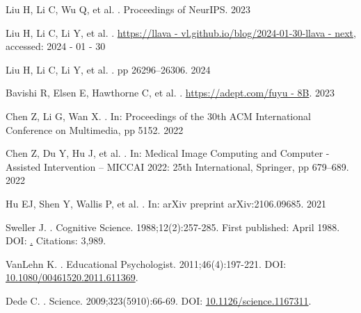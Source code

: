 \documentclass[10pt,letterpaper]{article}
\begin{document}
\begin{thebibliography}{10}
Liu H, Li C, Wu Q, et al.
.
\newblock Proceedings of NeurIPS. 2023

Liu H, Li C, Li Y, et al.
.
\newblock \url{https://llava - vl.github.io/blog/2024-01-30-llava - next}, accessed: 2024 - 01 - 30

Liu H, Li C, Li Y, et al.
.
\newblock pp 26296--26306. 2024

Bavishi R, Elsen E, Hawthorne C, et al.
.
\newblock \url{https://adept.com/fuyu - 8B}. 2023

Chen Z, Li G, Wan X.
.
\newblock In: Proceedings of the 30th ACM International Conference on Multimedia, pp 5152. 2022

Chen Z, Du Y, Hu J, et al.
.
\newblock In: Medical Image Computing and Computer - Assisted Intervention -- MICCAI 2022: 25th International, Springer, pp 679--689. 2022

Hu EJ, Shen Y, Wallis P, et al.
.
\newblock In: arXiv preprint arXiv:2106.09685. 2021


Sweller J.
.
\newblock Cognitive Science. 1988;12(2):257-285.
\newblock First published: April 1988.
\newblock DOI: \href{https://doi.org/10.1207/s15516709cog1202_4}.
\newblock Citations: 3,989.

VanLehn K.
.
\newblock Educational Psychologist. 2011;46(4):197-221.
\newblock DOI: \href{https://doi.org/10.1080/00461520.2011.611369}{10.1080/00461520.2011.611369}.

Dede C.
.
\newblock Science. 2009;323(5910):66-69.
\newblock DOI: \href{https://doi.org/10.1126/science.1167311}{10.1126/science.1167311}.


\end{thebibliography}
\end{document}
